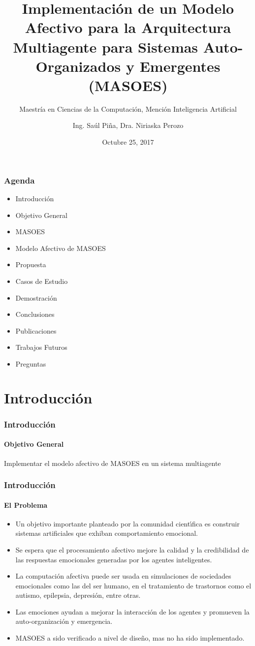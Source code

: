\documentclass{beamer}
\title{Implementación de un Modelo Afectivo para la Arquitectura Multiagente para Sistemas Auto-Organizados y Emergentes (MASOES)}
\subtitle{Maestría en Ciencias de la Computación, Mención Inteligencia Artificial}
\author{Ing. Saúl Piña, Dra. Niriaska Perozo}
\date{Octubre 25, 2017}
\institute{\url{sauljabin@gmail.com}, \url{nperozo@ucla.edu.ve}}
\begin{document}
\begin{frame}[plain,t]
\titlepage
\end{frame}

\begin{frame}
\frametitle{Agenda}
\begin{itemize}
\item Introducción
\item Objetivo General
\item MASOES
\item Modelo Afectivo de MASOES
\item Propuesta
\item Casos de Estudio
\item Demostración
\item Conclusiones
\item Publicaciones
\item Trabajos Futuros
\item Preguntas
\end{itemize}
\end{frame}

\section{Introducción}

\begin{frame}
\frametitle{Introducción}
\framesubtitle{Objetivo General}
\huge
Implementar el modelo afectivo de MASOES en un sistema multiagente
\end{frame}

\begin{frame}
\frametitle{Introducción}
\framesubtitle{El Problema}
\begin{itemize}
\item Un objetivo importante planteado por la
comunidad cientı́fica es construir sistemas artificiales que exhiban comportamiento emocional.
\item Se espera que el procesamiento afectivo mejore la calidad y la
credibilidad de las respuestas emocionales generadas por los
agentes inteligentes.
\item La computación afectiva puede ser usada en simulaciones de sociedades
emocionales como las del ser humano, en el tratamiento
de trastornos como el autismo, epilepsia, depresión, entre otras.
\item Las emociones ayudan a mejorar la interacción de los agentes y promueven la
auto-organización y emergencia.
\item MASOES a sido verificado a nivel de diseño, mas no ha sido implementado.
\end{itemize}
\end{frame}
\end{document}
